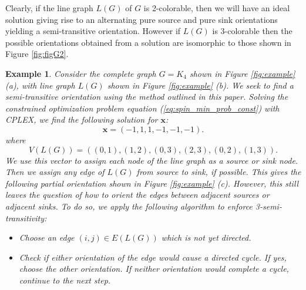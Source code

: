 \documentclass{article}
\newcommand{\mb}[1]{\boldsymbol{#1}}
\newtheorem{example}{Example}
\begin{document}
Clearly, if the line graph $L(G)$ of $G$ is 2-colorable, then we will have an ideal solution giving rise to an alternating pure source and pure sink orientations yielding a semi-transitive orientation. However if $L(G)$ is 3-colorable then the possible orientations obtained from a solution are isomorphic to those shown in Figure \ref{fig:figG2}.
\begin{example}\rm
Consider the complete graph $G=K_{4}$ shown in Figure \ref{fig:example} (a), with line graph $L(G)$ shown in Figure \ref{fig:example} (b). We seek to find a semi-transitive orientation using the method outlined in this paper. Solving the constrained optimization problem equation (\ref{eq:spin_min_prob_const}) with CPLEX, we find the following solution for $\mb{x}$:
\begin{equation}
    \mb{x}=(-1,1,1,-1,-1,-1).
\end{equation}
where
\begin{equation}
    V(L(G))=\left((0, 1), (1, 2), (0, 3), (2, 3), (0, 2), (1, 3)\right).
\end{equation}
We use this vector to assign each node of the line graph as a source or sink node. Then we assign any edge of $L(G)$ from source to sink, if possible. This gives the following partial orientation shown in Figure \ref{fig:example} (c). However, this still leaves the question of how to orient the edges between adjacent sources or adjacent sinks. To do so, we apply the following algorithm to enforce 3-semi-transitivity:
\begin{itemize}
    \item Choose an edge $(i,j)\in E(L(G))$ which is not yet directed.
    \item Check if either orientation of the edge would cause a directed cycle. If yes, choose the other orientation. If neither orientation would complete a cycle, continue to the next step.

\end{itemize}
\end{example}
\end{document}
